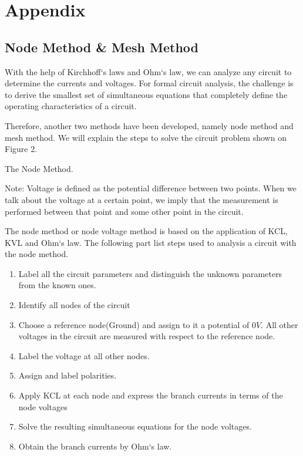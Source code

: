 \documentclass[a4 paper]{article}
\numberwithin{equation}{section}
\newcommand{\0}{\mathbf{0}}
\begin{document}
\section{Appendix}
\subsection{Node Method \& Mesh Method}
With the help of Kirchhoff`s laws and Ohm`s law, we can analyze any circuit to determine the currents and voltages. For formal circuit analysis, the challenge is to derive the smallest set of simultaneous equations that completely define the operating characteristics of a circuit.

Therefore, another two methods have been developed, namely node method and mesh method. We will explain the steps to solve the circuit problem shown on Figure 2.

The Node Method.

Note: Voltage is defined as the potential difference between two points. When we talk about the voltage at a certain point, we imply that the measurement is performed between that point and some other point in the circuit.

The node method or node voltage method is based on the application of KCL, KVL and Ohm`s law. The following part list steps used to analysis a circuit with the node method.

\begin{enumerate} \itemsep1pt \parskip0pt 
  \item Label all the circuit parameters and distinguish the unknown parameters from the known ones.
  \item Identify all nodes of the circuit
  \item Choose a reference node(Ground) and assign to it a potential of $0V$. All other voltages in the circuit are measured with respect to the reference node.
  \item Label the voltage at all other nodes.
  \item Assign and label polarities.
  \item Apply KCL at each node and express the branch currents in terms of the node voltages
  \item Solve the resulting simultaneous equations for the node voltages.
  \item Obtain the branch currents by Ohm`s law.
\end{enumerate}
\end{document}
